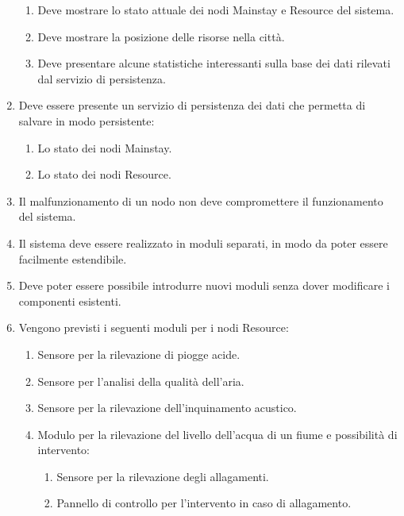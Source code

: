 \documentclass[12pt]{article}
\begin{document}
\begin{enumerate}
    \begin{enumerate}
        \item Deve mostrare lo stato attuale dei nodi Mainstay e Resource del sistema.
        \item Deve mostrare la posizione delle risorse nella città.
        \item Deve presentare alcune statistiche interessanti sulla base dei dati rilevati dal servizio di persistenza.
    \end{enumerate}
    \item Deve essere presente un servizio di persistenza dei dati che permetta di salvare in modo persistente:
    \begin{enumerate}
        \item Lo stato dei nodi Mainstay.
        \item Lo stato dei nodi Resource.
    \end{enumerate}
    \item Il malfunzionamento di un nodo non deve compromettere il funzionamento del sistema.
    \item Il sistema deve essere realizzato in moduli separati, in modo da poter essere facilmente estendibile.
    \item Deve poter essere possibile introdurre nuovi moduli senza dover modificare i componenti esistenti.
    \item Vengono previsti i seguenti moduli per i nodi Resource:
    \begin{enumerate}
        \item Sensore per la rilevazione di piogge acide.
        \item Sensore per l'analisi della qualità dell'aria.
        \item Sensore per la rilevazione dell'inquinamento acustico.
        \item Modulo per la rilevazione del livello dell'acqua di un fiume e possibilità di intervento:
        \begin{enumerate}
            \item Sensore per la rilevazione degli allagamenti.
            \item Pannello di controllo per l'intervento in caso di allagamento.
        \end{enumerate}
    \end{enumerate}
\end{enumerate}

\newpage


\end{document}
